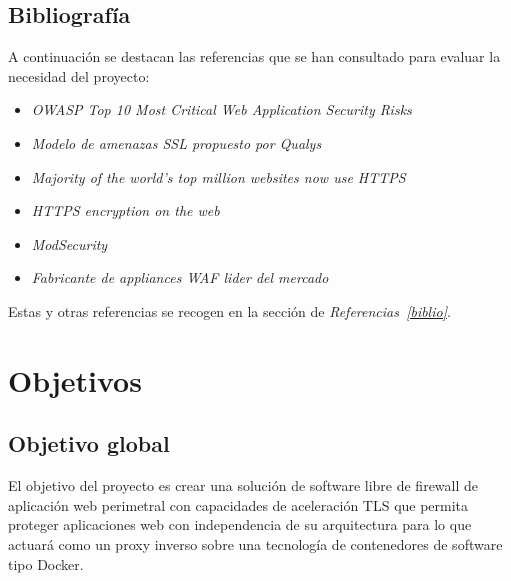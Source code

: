\subsection{Bibliografía}
\par A continuación se destacan las referencias que se han consultado para evaluar la necesidad del proyecto:
\begin{itemize}
  \item {\em OWASP Top 10 Most Critical Web Application Security Risks~ \cite{OWASP}}
  \item {\em Modelo de amenazas SSL propuesto por {\em Qualys}~ \cite{Qualys}}
  \item {\em Majority of the world’s top million websites now use HTTPS~ \cite{HTTPUSage}}
  \item {\em HTTPS encryption on the web~ \cite{Encryption}}
  \item {\em ModSecurity~ \cite{ModSecurity}}
  \item {\em Fabricante de appliances WAF lider del mercado~ \cite{Imperva}}
\end{itemize}
\par Estas y otras referencias se recogen en la sección de {\em Referencias~\ref{biblio}}.


\section{Objetivos}
\subsection{Objetivo global}
\par El objetivo del proyecto es crear una solución de software libre de firewall de aplicación web perimetral con
capacidades de aceleración TLS que permita proteger aplicaciones web con in\-de\-pen\-den\-cia de su arquitectura
para lo que actuará como un proxy inverso sobre una tecnología de contenedores de software tipo Docker.


